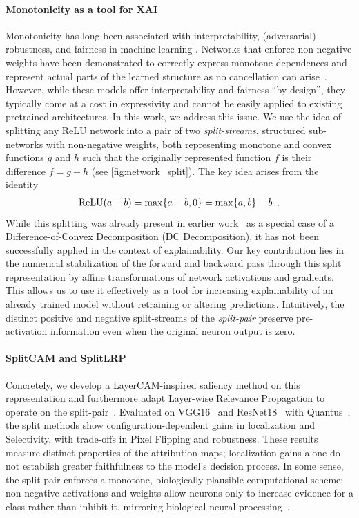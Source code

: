 \paragraph{Monotonicity as a tool for XAI}
Monotonicity has long been associated with interpretability, (adversarial) robustness, and fairness in machine learning \citep{Amos2017,Wang2020ShapeFairness,Liu2020CertifiedMonotone}. 
Networks that enforce non-negative weights
have been demonstrated to correctly express monotone dependences
and represent actual parts of the learned structure as no cancellation can arise~\citep{ayinde2018nonnegativity,lee1999nmf}.
However, while these models offer interpretability and fairness “by design”, they typically come at a cost in expressivity and cannot be easily applied to existing pretrained architectures.
In this work, we address this issue.
We use the idea of splitting any ReLU network into a pair of two \emph{split-streams}, structured sub-networks with non-negative weights, both representing monotone and convex functions $g$ and $h$ such that the originally represented function $f$ is their difference $f=g - h$ (see \cref{fig:network_split}).
The key idea arises from the identity
\begin{align}
    \text{ReLU}(a-b) = \max\{a-b,0\} = \max\{a,b\} - b \enspace \label{eq:max_formulation}.
\end{align}
While this splitting was already present in earlier work~\citep{Siahkamari2020_DCRegression,Awasthi2023DCNN} as a special case of a Difference-of-Convex Decomposition (DC Decomposition), it has not been successfully applied in the context of explainability.
Our key contribution lies in the numerical stabilization of the forward and backward pass through this split representation by affine transformations of network activations and gradients.
This allows us to use it effectively as a tool for increasing explainability of an already trained model without retraining or altering predictions. 
Intuitively, the distinct positive and negative split-streams of the \emph{split-pair} preserve pre-activation information even when the original neuron output is zero. 

\paragraph{SplitCAM and SplitLRP}
Concretely, we develop a LayerCAM-inspired saliency method on this representation \citep{Jiang2021LayerCAM} and furthermore adapt Layer-wise Relevance Propagation to operate on the split-pair~\citep{Bach2015}.
Evaluated on VGG16~\citep{Simonyan2015} and ResNet18~\citep{Kaiming2016_resnet} with Quantus~\citep{Hedstrom2023}, the split methods show configuration-dependent gains in localization and Selectivity, with trade-offs in Pixel Flipping and robustness. These results measure distinct properties of the attribution maps; localization gains alone do not establish greater faithfulness to the model's decision process.
In some sense, the split-pair enforces a monotone, biologically plausible computational scheme:
non-negative activations and weights allow neurons only to increase evidence for a class rather than inhibit it, mirroring biological neural processing~\citep{lee1999nmf,Dayan2001_TheoreticalNeuroscience}.

